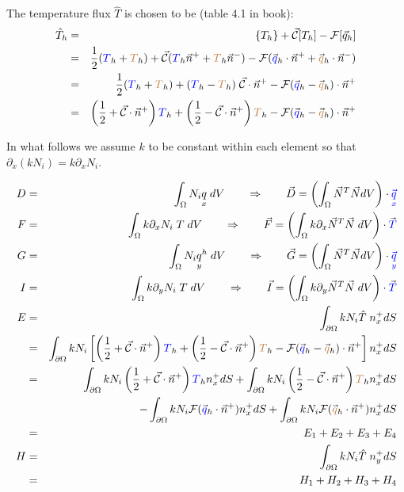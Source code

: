 The temperature flux $\hat{T}$ is chosen to be (table 4.1 in book):
\begin{eqnarray}
\hat{T}_h 
&=& \{ T_h \} + \vec{\cal C} [T_h] - {\cal F} [\vec{q}_h] \\
&=& \frac{1}{2}({\color{blue} T}_h + {\color{brown} T}_h)   
+ \vec{\cal C} ({\color{blue} T}_h \vec{n}^+ + {{\color{brown} T}}_h \vec{n}^-) 
- {\cal F}   (\vec{\color{blue}q}_h \cdot \vec{n}^+ + \vec{\color{brown} q}_h \cdot \vec{n}^-) \\
&=& \frac{1}{2}({\color{blue} T}_h + {\color{brown} T}_h)   
+  ({\color{blue} T}_h  - {\color{brown} T}_h ) \; \vec{\cal C}\cdot\vec{n}^+  
- {\cal F} (\vec{\color{blue}q}_h - \vec{\color{brown}q}_h) \cdot \vec{n}^+ \\
&=& \left( \frac{1}{2} + \vec{\cal C} \cdot \vec{n}^+ \right) {\color{blue} T}_h 
+ \left( \frac{1}{2} - \vec{\cal C} \cdot \vec{n}^+ \right) {\color{brown} T}_h 
- {\cal F} (\vec{\color{blue}q}_h - \vec{\color{brown}q}_h) \cdot \vec{n}^+ 
\end{eqnarray}



In what follows we assume $k$ to be constant within each element so that $\partial_x (k N_i)= k \partial_x N_i$.

\begin{eqnarray}
D &=& \int_\Omega N_i  \underset{\tiny x}{q}\;  dV 
\qquad \Rightarrow \qquad  \vec{D} = \left( \int_\Omega \vec{N}^T \vec{N} dV \right) \cdot {\color{blue}\vec{\underset{\tiny x}{q}}} \\ 
F &=& \int_\Omega k \partial_x N_i \;  T \; dV 
\qquad \Rightarrow \qquad \vec{F} = \left( \int_\Omega k \partial_x \vec{N}^T \vec{N} \; dV \right) \cdot \vec{\color{blue} T} \\
G &=&  \int_\Omega N_i  \underset{\tiny y}{q}^h \; dV
\qquad \Rightarrow \qquad \vec{G} = \left( \int_\Omega \vec{N}^T \vec{N} dV \right) \cdot {\color{blue}\vec{\underset{\tiny y}{q}}} \\ 
I &=&  \int_\Omega k \partial_y N_i \;  T \; dV 
\qquad \Rightarrow \qquad \vec{I} = \left( \int_\Omega k \partial_y \vec{N}^T \vec{N} \; dV \right) \cdot \vec{\color{blue} T} \\
E &=&  \int_{\partial\Omega} k N_i \hat{T} \; n^+_x dS \nonumber\\
 &=&  
\int_{\partial\Omega} k N_i 
\left[  \left( \frac{1}{2} + \vec{\cal C} \cdot \vec{n}^+ \right) {\color{blue} T}_h 
+ \left( \frac{1}{2} - \vec{\cal C} \cdot \vec{n}^+ \right) {\color{brown} T}_h 
- {\cal F} (\vec{\color{blue}q}_h - \vec{\color{brown}q}_h) \cdot \vec{n}^+ 
\right] n^+_x dS \nonumber\\
 &=&  
\int_{\partial\Omega} k N_i \left( \frac{1}{2} + \vec{\cal C} \cdot \vec{n}^+ \right) {\color{blue} T}_h  n^+_x dS 
+\int_{\partial\Omega} k N_i \left( \frac{1}{2} - \vec{\cal C} \cdot \vec{n}^+ \right) {\color{brown} T}_h   n^+_x dS \nonumber\\
&&-
\int_{\partial\Omega} k N_i  {\cal F} (\vec{\color{blue}q}_h \cdot \vec{n}^+ )  n^+_x dS 
+
\int_{\partial\Omega} k N_i  {\cal F} (\vec{\color{brown}q}_h \cdot \vec{n}^+ )  n^+_x dS \nonumber\\
&=& E_1  + E_2 + E_3 + E_4 \nonumber\\
H &=& 
\int_{\partial\Omega} k N_i  \hat{T} \; n^+_y dS \nonumber\\
&=& H_1+H_2+H_3+H_4
\end{eqnarray}

